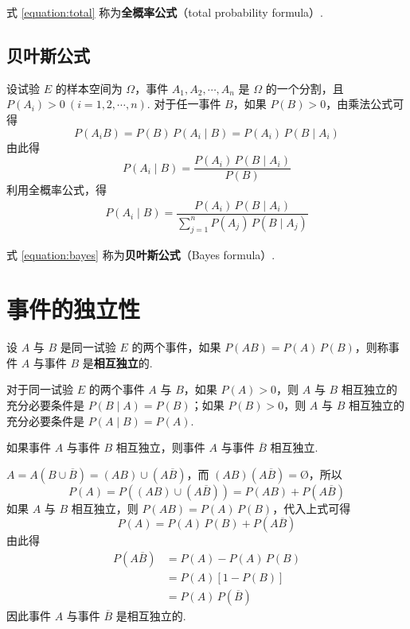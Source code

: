 式 \eqref{equation:total} 称为\textbf{全概率公式}（total probability formula）.

\subsection{贝叶斯公式}

设试验 $E$ 的样本空间为 $\varOmega$，事件 $A_1,A_2,\cdots,A_n$ 是 $\varOmega$ 的一个分割，且 $P(A_i)>0 \ (i=1,2,\cdots,n)$. 对于任一事件 $B$，如果 $P(B)>0$，由乘法公式可得
$$
P(A_i B) = P(B) \, P(A_i \mid B) = P(A_i) \, P(B \mid A_i)
$$
由此得
$$
P(A_i \mid B)=\dfrac{P(A_i) \, P(B \mid A_i)}{P(B)}
$$
利用全概率公式，得
\begin{gather} \label{equation:bayes}
    P(A_i \mid B) = \dfrac{P(A_i) \, P(B \mid A_i)}{\displaystyle\sum_{j=1}^n P(A_j) \, P(B \mid A_j)}
\end{gather}

式 \eqref{equation:bayes} 称为\textbf{贝叶斯公式}（Bayes formula）.

\section{事件的独立性}

\begin{definition} \label{def:event-independence}
    设 $A$ 与 $B$ 是同一试验 $E$ 的两个事件，如果 $P(AB)=P(A)\,P(B)$，则称事件 $A$ 与事件 $B$ 是\textbf{相互独立}的.
\end{definition}

对于同一试验 $E$ 的两个事件 $A$ 与 $B$，如果 $P(A)>0$，则 $A$ 与 $B$ 相互独立的充分必要条件是 $P(B \mid A)=P(B)$；如果 $P(B)>0$，则 $A$ 与 $B$ 相互独立的充分必要条件是 $P(A \mid B)=P(A)$.

\begin{conclusion}
    如果事件 $A$ 与事件 $B$ 相互独立，则事件 $A$ 与事件 $\overline{B}$ 相互独立.
\end{conclusion}

\begin{myproof}
    $A = A (B \cup \overline{B}) = (AB) \cup (A \overline{B})$，而 $(AB)(A \overline{B})=\text{\O}$，所以
    $$
    P(A) = P((AB) \cup (A \overline{B})) = P(AB) + P(A \overline{B})
    $$
    如果 $A$ 与 $B$ 相互独立，则 $P(AB)=P(A)\,P(B)$，代入上式可得
    $$
    P(A) = P(A) \, P(B) + P(A \overline{B})
    $$
    由此得
    $$
    \begin{aligned}
        P(A \overline{B}) &= P(A) - P(A) \, P(B)\\
        &= P(A)[1-P(B)]\\
        &= P(A) \, P(\overline{B})
    \end{aligned}
    $$
    因此事件 $A$ 与事件 $\overline{B}$ 是相互独立的.
\end{myproof}

